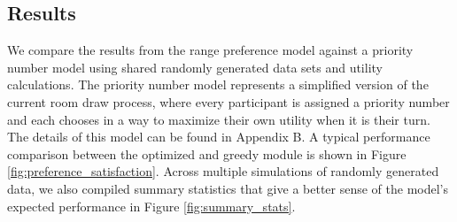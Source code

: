 \documentclass[12pt]{article}
\begin{document}
    \subsection*{Results}
    \FloatBarrier
    We compare the results from the range preference model against a priority number model using shared randomly generated data sets and utility calculations. The priority number model represents a simplified version of the current room draw process, where every participant is assigned a priority number and each chooses in a way to maximize their own utility when it is their turn. The details of this model can be found in Appendix B. A typical performance comparison between the optimized and greedy module is shown in Figure \ref{fig:preference_satisfaction}. Across multiple simulations of randomly generated data, we also compiled summary statistics that give a better sense of the model's expected performance in Figure \ref{fig:summary_stats}.
\end{document}
